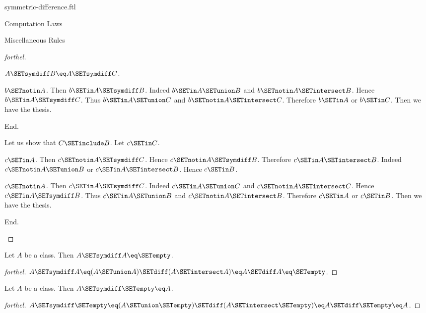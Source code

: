 \documentclass{naproche-library}
\begin{document}
\begin{smodule}[title=Symmetric Difference]{symmetric-difference.ftl}
\begin{sfragment}{Computation Laws}
\begin{sfragment}{Miscellaneous Rules}
\begin{proof}[forthel]
\begin{case}{$A \SETsymdiff B \eq A \SETsymdiff C$.}
          \begin{case}{$b \SETnotin A$.}
            Then $b \SETin A \SETsymdiff B$.
            Indeed $b \SETin A \SETunion B$ and $b \SETnotin A \SETintersect B$.
            Hence $b \SETin A \SETsymdiff C$.
            Thus $b \SETin A \SETunion C$ and $b \SETnotin A \SETintersect C$.
            Therefore $b \SETin A$ or $b \SETin C$.
            Then we have the thesis.
          \end{case}
        End.

        Let us show that $C \SETinclude B$.
          Let $c \SETin C$.

          \begin{case}{$c \SETin A$.}
            Then $c \SETnotin A \SETsymdiff C$.
            Hence $c \SETnotin A \SETsymdiff B$.
            Therefore $c \SETin A \SETintersect B$.
            Indeed $c \SETnotin A \SETunion B$ or $c \SETin A \SETintersect B$.
            Hence $c \SETin B$.
          \end{case}

          \begin{case}{$c \SETnotin A$.}
            Then $c \SETin A \SETsymdiff C$.
            Indeed $c \SETin A \SETunion C$ and $c \SETnotin A \SETintersect C$.
            Hence $c \SETin A \SETsymdiff B$.
            Thus $c \SETin A \SETunion B$ and $c \SETnotin A \SETintersect B$.
            Therefore $c \SETin A$ or $c \SETin B$.
            Then we have the thesis.
          \end{case}
        End.
      \end{case}
    \end{proof}

    \begin{proposition}[forthel,id=FOUNDATIONS_03_4578696040022016]
      Let $A$ be a class.
      Then $A \SETsymdiff A \eq \SETempty$.
    \end{proposition}
    \begin{proof}[forthel]
      $A \SETsymdiff A
        \eq (A \SETunion A) \SETdiff (A \SETintersect A)
        \eq A \SETdiff A
        \eq \SETempty$.
    \end{proof}

    \begin{proposition}[forthel,id=FOUNDATIONS_03_6698730398941184]
      Let $A$ be a class.
      Then $A \SETsymdiff \SETempty \eq A$.
    \end{proposition}
    \begin{proof}[forthel]
      $A \SETsymdiff \SETempty
        \eq (A \SETunion \SETempty) \SETdiff (A \SETintersect \SETempty)
        \eq A \SETdiff \SETempty
        \eq A$.
    \end{proof}


\end{sfragment}
\end{sfragment}
\end{smodule}
\end{document}
